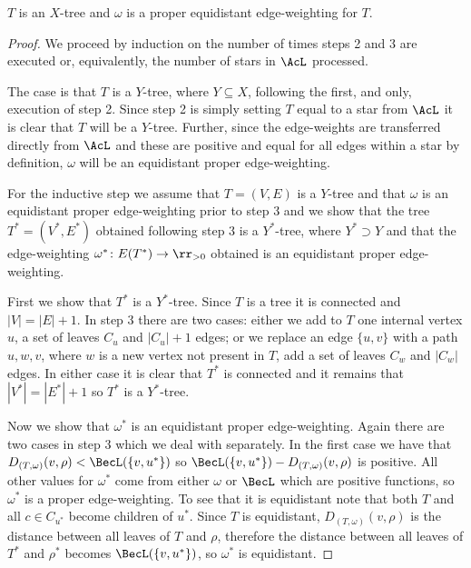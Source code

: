 \begin{lem}
  \label{lem:t-is-x-tree}
  $T$ is an $X$-tree and $\omega$ is a proper equidistant edge-weighting for
  $T$.
\end{lem}

\begin{proof}
  We proceed by induction on the number of times steps 2 and 3 are executed
  or, equivalently, the number of stars in $\AcL$ processed.

  The case is that $T$ is a $Y$-tree, where $Y \subseteq X$, following the
  first, and only, execution of step 2.  Since step 2 is simply setting $T$
  equal to a star from $\AcL$ it is clear that $T$ will be a $Y$-tree.
  Further, since the edge-weights are transferred directly from $\AcL$ and
  these are positive and equal for all edges within a star by definition,
  $\omega$ will be an equidistant proper edge-weighting.

  For the inductive step we assume that $T = (V,E)$ is a $Y$-tree and that
  $\omega$ is an equidistant proper edge-weighting prior to step 3 and we show
  that the tree $T^* = (V^*,E^*)$ obtained following step 3 is a $Y^*$-tree,
  where $Y^* \supset Y$ and that the edge-weighting $\omega^* \colon E(T^*)
  \to \rr_{>0}$ obtained is an equidistant proper edge-weighting.

  First we show that $T^*$ is a $Y^*$-tree.  Since $T$ is a tree it is
  connected and $|V| = |E| + 1$.  In step 3 there are two cases: either we add
  to $T$ one internal vertex $u$, a set of leaves $C_u$ and $|C_u|+1$ edges;
  or we replace an edge $\{u,v\}$ with a path $u,w,v$, where $w$ is a new
  vertex not present in $T$, add a set of leaves $C_w$ and $|C_w|$ edges.  In
  either case it is clear that $T^*$ is connected and it remains that
  $|V^*| = |E^*| + 1$ so $T^*$ is a $Y^*$-tree.

  Now we show that $\omega^*$ is an equidistant proper edge-weighting.  Again
  there are two cases in step 3 which we deal with separately.  In the first
  case we have that $D_{(T,\omega)}(v,\rho) < \BecL(\{v,u^*\})$ so
  $\BecL(\{v,u^*\}) - D_{(T,\omega)}(v,\rho)$ is positive.  All other values
  for $\omega^*$ come from either $\omega$ or $\BecL$ which are positive
  functions, so $\omega^*$ is a proper edge-weighting.  To see that it is
  equidistant note that both $T$ and all $c \in C_{u^*}$ become children of
  $u^*$.  Since $T$ is equidistant, $D_{(T,\omega)}(v,\rho)$ is the distance
  between all leaves of $T$ and $\rho$, therefore the distance between all
  leaves of $T^*$ and $\rho^*$ becomes $\BecL(\{v,u^*\})$, so $\omega^*$ is
  equidistant.


\end{proof}
